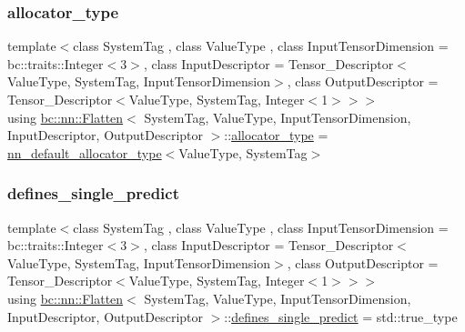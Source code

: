 \subsubsection{\texorpdfstring{allocator\+\_\+type}{allocator\_type}}
{\footnotesize\ttfamily template$<$class System\+Tag , class Value\+Type , class Input\+Tensor\+Dimension  = bc\+::traits\+::\+Integer$<$3$>$, class Input\+Descriptor  = Tensor\+\_\+\+Descriptor$<$\+Value\+Type, System\+Tag, Input\+Tensor\+Dimension$>$, class Output\+Descriptor  = Tensor\+\_\+\+Descriptor$<$\+Value\+Type, System\+Tag, Integer$<$1$>$$>$$>$ \\
using \hyperlink{structbc_1_1nn_1_1Flatten}{bc\+::nn\+::\+Flatten}$<$ System\+Tag, Value\+Type, Input\+Tensor\+Dimension, Input\+Descriptor, Output\+Descriptor $>$\+::\hyperlink{structbc_1_1nn_1_1Flatten_aac419d81dc54ef6d11b042a0ad05cc11}{allocator\+\_\+type} =  \hyperlink{namespacebc_1_1nn_a0025752fc3f47f988b3fae106c825860}{nn\+\_\+default\+\_\+allocator\+\_\+type}$<$Value\+Type, System\+Tag$>$}

\mbox{\label{structbc_1_1nn_1_1Flatten_a09f418b2c69a0675443ea4f86d94dffc}} 
\subsubsection{\texorpdfstring{defines\+\_\+single\+\_\+predict}{defines\_single\_predict}}
{\footnotesize\ttfamily template$<$class System\+Tag , class Value\+Type , class Input\+Tensor\+Dimension  = bc\+::traits\+::\+Integer$<$3$>$, class Input\+Descriptor  = Tensor\+\_\+\+Descriptor$<$\+Value\+Type, System\+Tag, Input\+Tensor\+Dimension$>$, class Output\+Descriptor  = Tensor\+\_\+\+Descriptor$<$\+Value\+Type, System\+Tag, Integer$<$1$>$$>$$>$ \\
using \hyperlink{structbc_1_1nn_1_1Flatten}{bc\+::nn\+::\+Flatten}$<$ System\+Tag, Value\+Type, Input\+Tensor\+Dimension, Input\+Descriptor, Output\+Descriptor $>$\+::\hyperlink{structbc_1_1nn_1_1Flatten_a09f418b2c69a0675443ea4f86d94dffc}{defines\+\_\+single\+\_\+predict} =  std\+::true\+\_\+type}

\mbox{\label{structbc_1_1nn_1_1Flatten_afd38f0f24bbf98d7f5ecb70198a16b16}} 
